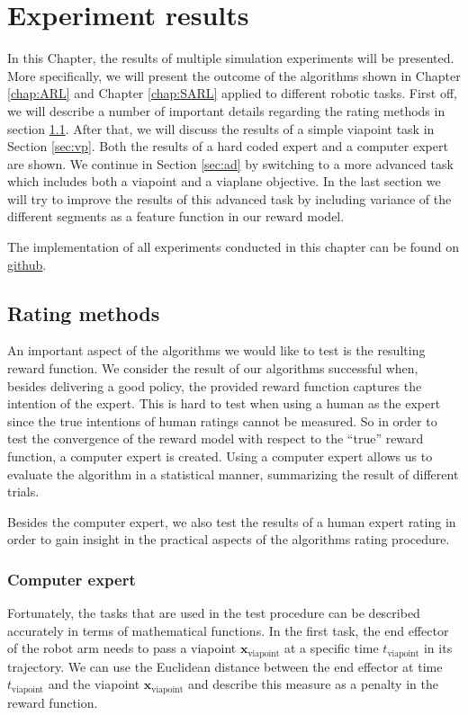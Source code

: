 \documentclass[mscThesis.tex]{subfiles}
\begin{document}
\chapter{Experiment results}
\label{chap:Ex}

In this Chapter, the results of multiple simulation experiments will be presented. More specifically, we will present the outcome of the algorithms shown in Chapter \ref{chap:ARL} and Chapter \ref{chap:SARL} applied to different robotic tasks. 
First off, we will describe a number of important details regarding the rating methods in section \ref{sec:rating-methods}. After that, we will discuss the results of a simple viapoint task in Section \ref{sec:vp}. Both the results of a hard coded expert and a computer expert are shown. We continue in Section \ref{sec:ad} by switching to a more advanced task which includes both a viapoint and a viaplane objective. In the last section we will try to improve the results of this advanced task by including variance of the different segments as a feature function in our reward model. 

The implementation of all experiments conducted in this chapter can be found on \href{https://github.com/RonaldOlsthoorn/RewardLearning}{github}.

\section{Rating methods}
\label{sec:rating-methods}
An important aspect of the algorithms we would like to test is the resulting reward function. We consider the result of our algorithms successful when, besides delivering a good policy, the provided reward function captures the intention of the expert. This is hard to test when using a human as the expert since the true intentions of human ratings cannot be measured. So in order to test the convergence of the reward model with respect to the ``true'' reward function, a computer expert is created. Using a computer expert allows us to evaluate the algorithm in a statistical manner, summarizing the result of different trials. 

Besides the computer expert, we also test the results of a human expert rating in order to gain insight in the practical aspects of the algorithms rating procedure.

\subsection{Computer expert}
Fortunately, the tasks that are used in the test procedure can be described accurately in terms of mathematical functions. In the first task, the end effector of the robot arm needs to pass a viapoint $\bm{x}_{\text{viapoint}}$ at a specific time $t_{\text{viapoint}}$ in its trajectory. We can use the Euclidean distance between the end effector at time $t_{\text{viapoint}}$ and the viapoint $\bm{x}_{\text{viapoint}}$ and describe this measure as a penalty in the reward function. 
\end{document}
